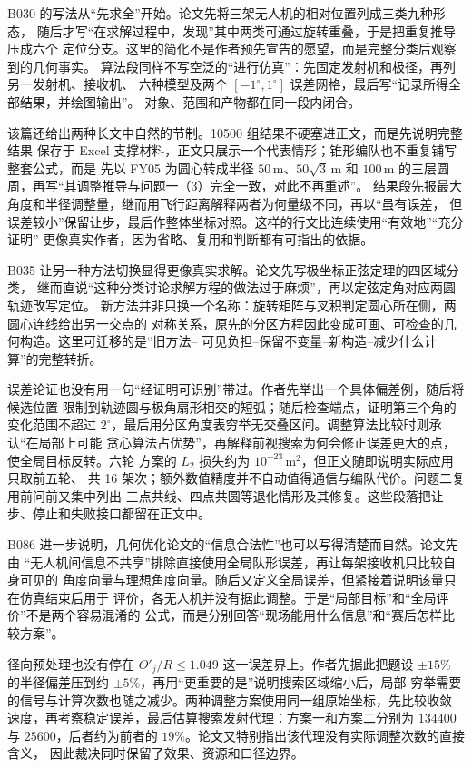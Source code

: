 B030 的写法从“先求全”开始。论文先将三架无人机的相对位置列成三类九种形态，
随后才写“在求解过程中，发现”其中两类可通过旋转重叠，于是把重复推导压成六个
定位分支。这里的简化不是作者预先宣告的愿望，而是完整分类后观察到的几何事实。
算法段同样不写空泛的“进行仿真”：先固定发射机和极径，再列另一发射机、接收机、
六种模型及两个 $[-1^\circ,1^\circ]$ 误差网格，最后写“记录所得全部结果，并绘图输出”。
对象、范围和产物都在同一段内闭合。

该篇还给出两种长文中自然的节制。10500 组结果不硬塞进正文，而是先说明完整结果
保存于 Excel 支撑材料，正文只展示一个代表情形；锥形编队也不重复铺写整套公式，而是
先以 FY05 为圆心转成半径 $50\,\mathrm{m}$、$50\sqrt{3}\,\mathrm{m}$ 和
$100\,\mathrm{m}$ 的三层圆周，再写“其调整推导与问题一（3）完全一致，对此不再重述”。
结果段先报最大角度和半径调整量，继而用飞行距离解释两者为何量级不同，再以“虽有误差，
但误差较小”保留让步，最后作整体坐标对照。这样的行文比连续使用“有效地”“充分证明”
更像真实作者，因为省略、复用和判断都有可指出的依据。

B035 让另一种方法切换显得更像真实求解。论文先写极坐标正弦定理的四区域分类，
继而直说“这种分类讨论求解方程的做法过于麻烦”，再以定弦定角对应两圆轨迹改写定位。
新方法并非只换一个名称：旋转矩阵与叉积判定圆心所在侧，两圆心连线给出另一交点的
对称关系，原先的分区方程因此变成可画、可检查的几何构造。这里可迁移的是“旧方法--
可见负担--保留不变量--新构造--减少什么计算”的完整转折。

误差论证也没有用一句“经证明可识别”带过。作者先举出一个具体偏差例，随后将候选位置
限制到轨迹圆与极角扇形相交的短弧；随后检查端点，证明第三个角的变化范围不超过
$2^\circ$，最后用分区角度表穷举无交叠区间。调整算法比较时则承认“在局部上可能
贪心算法占优势”，再解释前视搜索为何会修正误差更大的点，使全局目标反转。六轮
方案的 $L_2$ 损失约为 $10^{-23}\,\mathrm{m}^2$，但正文随即说明实际应用只取前五轮、
共 16 架次；额外数值精度并不自动值得通信与编队代价。问题二复用前问前又集中列出
三点共线、四点共圆等退化情形及其修复。这些段落把让步、停止和失败接口都留在正文中。

B086 进一步说明，几何优化论文的“信息合法性”也可以写得清楚而自然。论文先由
“无人机间信息不共享”排除直接使用全局队形误差，再让每架接收机只比较自身可见的
角度向量与理想角度向量。随后又定义全局误差，但紧接着说明该量只在仿真结束后用于
评价，各无人机并没有据此调整。于是“局部目标”和“全局评价”不是两个容易混淆的
公式，而是分别回答“现场能用什么信息”和“赛后怎样比较方案”。

径向预处理也没有停在 $O'_j/R\leq1.049$ 这一误差界上。作者先据此把题设
$\pm15\%$ 的半径偏差压到约 $\pm5\%$，再用“更重要的是”说明搜索区域缩小后，局部
穷举需要的信号与计算次数也随之减少。两种调整方案使用同一组原始坐标，先比较收敛
速度，再考察稳定误差，最后估算搜索发射代理：方案一和方案二分别为 $134400$ 与
$25600$，后者约为前者的 $19\%$。论文又特别指出该代理没有实际调整次数的直接含义，
因此裁决同时保留了效果、资源和口径边界。

